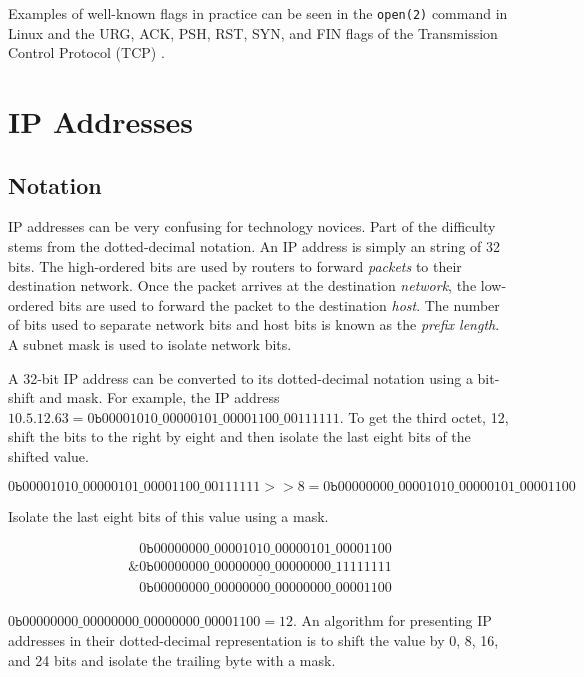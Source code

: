 \documentclass{book}
\begin{document}
Examples of well-known flags in practice can be seen in the \texttt{open(2)} command in Linux and the URG, ACK, PSH, RST, SYN, and FIN flags of the Transmission Control Protocol (TCP) \cite{open_manpage} \cite{rfc793}.

\section{IP Addresses}
\subsection{Notation}
IP addresses can be very confusing for technology novices. Part of the difficulty stems from the dotted-decimal notation. An IP address is simply an string of 32 bits. The high-ordered bits are used by routers to forward \textit{packets} to their destination network. Once the packet arrives at the destination \textit{network}, the low-ordered bits are used to forward the packet to the destination \textit{host}. The number of bits used to separate network bits and host bits is known as the \textit{prefix length}. A subnet mask is used to isolate network bits.

A 32-bit IP address can be converted to its dotted-decimal notation using a bit-shift and mask. For example, the IP address $10.5.12.63 = 0\texttt{b}00001010\_00000101\_00001100\_00111111$. To get the third octet, 12, shift the bits to the right by eight and then isolate the last eight bits of the shifted value.

\[
0\texttt{b}00001010\_00000101\_00001100\_00111111 >> 8 = 0\texttt{b}00000000\_00001010\_00000101\_00001100
\]

Isolate the last eight bits of this value using a mask.

\begin{equation*}
\begin{array}{c}
\phantom{\texttt{\&}}0\texttt{b}00000000\_00001010\_00000101\_00001100 \\
\underline{\texttt{\&}0\texttt{b}00000000\_00000000\_00000000\_11111111} \\
\phantom{\texttt{\&}}0\texttt{b}00000000\_00000000\_00000000\_00001100
\end{array}
\end{equation*}

$0\texttt{b}00000000\_00000000\_00000000\_00001100 = 12$. An algorithm for presenting IP addresses in their dotted-decimal representation is to shift the value by 0, 8, 16, and 24 bits and isolate the trailing byte with a mask.
\end{document}
